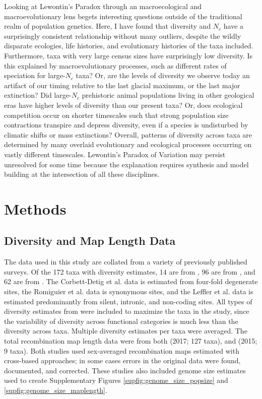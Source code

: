 \documentclass[11pt]{article}
\begin{document}
Looking at Lewontin's Paradox through an macroecological and macroevolutionary
lens begets interesting questions outside of the traditional realm of
population genetics.  Here, I have found that diversity and $N_c$ have a
surprisingly consistent relationship without many outliers, despite the wildly
disparate ecologies, life histories, and evolutionary histories of the taxa
included. Furthermore, taxa with very large census sizes have surprisingly low
diversity. Is this explained by macroevolutionary processes, such as different
rates of speciation for large-$N_c$ taxa? Or, are the levels of diversity we
observe today an artifact of our timing relative to the last glacial maximum,
or the last major extinction? Did large-$N_c$ prehistoric animal populations
living in other geological eras have higher levels of diversity than our
present taxa? Or, does ecological competition occur on shorter timescales such
that strong population size contractions transpire and depress diversity, even
if a species is undisturbed by climatic shifts or mass extinctions? Overall,
patterns of diversity across taxa are determined by many overlaid evolutionary
and ecological processes occurring on vastly different timescales. Lewontin's
Paradox of Variation may persist unresolved for some time because the
explanation requires synthesis and model building at the intersection of all
these disciplines.


\section*{Methods}

\subsection*{Diversity and Map Length Data}
\label{sec:methods-diversity}

The data used in this study are collated from a variety of previously published
surveys. Of the 172 taxa with diversity estimates, 14 are from
\textcite{Corbett-Detig2015-gt}, 96 are from \textcite{Leffler2012-zj}, and 62
are from \textcite{Romiguier2014-bp}. The Corbett-Detig et al. data is
estimated from four-fold degenerate sites, the Romiguier et al. data is
synonymous sites, and the Leffler et al. data is estimated predominantly from
silent, intronic, and non-coding sites. All types of diversity estimates from
\textcite{Leffler2012-zj} were included to maximize the taxa in the study,
since the variability of diversity across functional categories is much less
than the diversity across taxa. Multiple diversity estimates per taxa were
averaged. The total recombination map length data were from both
\citeauthor{Stapley2017-fs} (2017; 127 taxa), and
\citeauthor{Corbett-Detig2015-gt} (2015; 9 taxa). Both studies used
sex-averaged recombination maps estimated with cross-based approaches; in some
cases errors in the original data were found, documented, and corrected. These
studies also included genome size estimates used to create Supplementary
Figures \ref{supfig:genome_size_popsize} and
\ref{supfig:genome_size_maplength}. 
\end{document}
